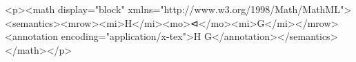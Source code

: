 <p><math display="block" xmlns="http://www.w3.org/1998/Math/MathML"><semantics><mrow><mi>H</mi><mo>⊲</mo><mi>G</mi></mrow><annotation encoding="application/x-tex">H \vartriangleleft G</annotation></semantics></math></p>
